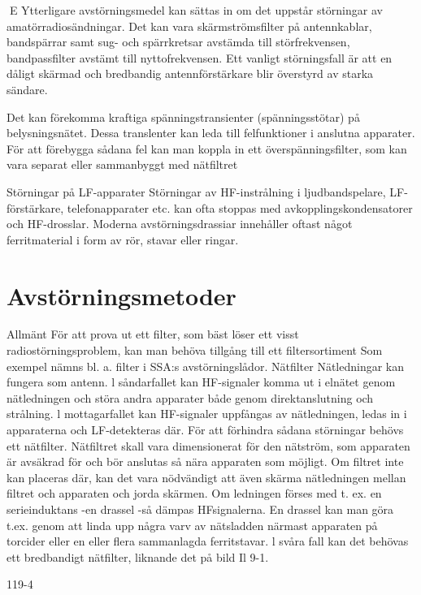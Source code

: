 \documentclass[a4paper,twoside,twocolumn,openright]{book}
\begin{document}
{{{{{E
Ytterligare avstörningsmedel kan sättas
in om det uppstår störningar av amatörradiosändningar. Det kan vara skärmströmsfilter
på antennkablar, bandspärrar samt sug- och
spärrkretsar avstämda till störfrekvensen,
bandpassfilter avstämt till nyttofrekvensen.
Ett vanligt störningsfall är att en dåligt
skärmad och bredbandig antennförstärkare
blir överstyrd av starka sändare.

Det kan förekomma kraftiga spänningstransienter (spänningsstötar) på belysningsnätet. Dessa translenter kan leda till felfunktioner i anslutna apparater. För att förebygga
sådana fel kan man koppla in ett överspänningsfilter, som kan vara separat eller sammanbyggt med nätfiltret

Störningar på LF-apparater
Störningar av HF-instrålning i ljudbandspelare, LF-förstärkare, telefonapparater etc. kan
ofta stoppas med avkopplingskondensatorer och HF-drosslar. Moderna avstörningsdrassiar innehåller oftast något ferritmaterial
i form av rör, stavar eller ringar.

\section{Avstörningsmetoder}

Allmänt
För att prova ut ett filter, som bäst löser ett
visst radiostörningsproblem, kan man behöva tillgång till ett filtersortiment
Som exempel nämns bl. a. filter i SSA:s
avstörningslådor.
Nätfilter
Nätledningar kan fungera som antenn. l
såndarfallet kan HF-signaler komma ut i
elnätet genom nätledningen och störa andra
apparater både genom direktanslutning och
strålning. l mottagarfallet kan HF-signaler
uppfångas av nätledningen, ledas in i apparaterna och LF-detekteras där. För att förhindra sådana störningar behövs ett nätfilter.
Nätfiltret skall vara dimensionerat för den
nätström, som apparaten är avsäkrad för och
bör anslutas så nära apparaten som möjligt.
Om filtret inte kan placeras där, kan det vara
nödvändigt att även skärma nätledningen
mellan filtret och apparaten och jorda skärmen.
Om ledningen förses med t. ex. en serieinduktans -en drassel -så dämpas HFsignalerna. En drassel kan man göra t.ex.
genom att linda upp några varv av nätsladden
närmast apparaten på torcider eller en eller
flera sammanlagda ferritstavar. l svåra fall
kan det behövas ett bredbandigt nätfilter,
liknande det på bild Il 9-1.

119-4

}}}}}
\end{document}
